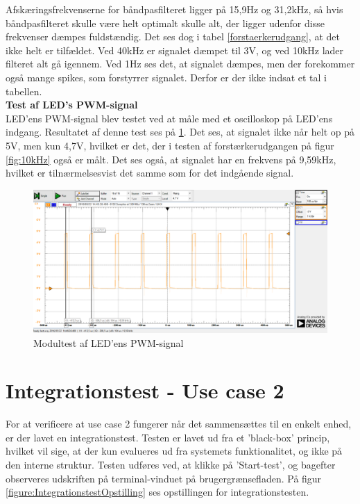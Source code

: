Afskæringsfrekvenserne for båndpasfilteret ligger på 15,9Hz og 31,2kHz, så hvis båndpasfilteret skulle være helt optimalt skulle alt, der ligger udenfor disse frekvenser dæmpes fuldstændig. Det ses dog i tabel \ref{forstaerkerudgang}, at det ikke helt er tilfældet. Ved 40kHz er signalet dæmpet til 3V, og ved 10kHz lader filteret alt gå igennem. Ved 1Hz ses det, at signalet dæmpes, men der forekommer også mange spikes, som forstyrrer signalet. Derfor er der ikke indsat et tal i tabellen. \\

\noindent \textbf{Test af LED's PWM-signal} \\
\noindent LED'ens PWM-signal blev testet ved at måle med et oscilloskop på LED'ens indgang. Resultatet af denne test ses på \ref{fig:LED_indgang}. Det ses, at signalet ikke når helt op på 5V, men kun 4,7V, hvilket er det, der i testen af forstærkerudgangen på figur \ref{fig:10kHz} også er målt. Det ses også, at signalet har en frekvens på 9,59kHz, hvilket er tilnærmelsesvist det samme som for det indgående signal. 

\begin{figure}[H]
	\centering
	\includegraphics[width=\textwidth]{Test/images/AffyringTest/LED_indgang}
	\caption{Modultest af LED'ens PWM-signal}
	\label{fig:LED_indgang}
\end{figure}

\section{Integrationstest - Use case 2}
For at verificere at use case 2 fungerer når det sammensættes til en enkelt enhed, er der lavet en integrationstest. Testen er lavet ud fra et 'black-box' princip, hvilket vil sige, at der kun evalueres ud fra systemets funktionalitet, og ikke på den interne struktur.
Testen udføres ved, at klikke på 'Start-test', og bagefter observeres udskriften på terminal-vinduet på brugergrænsefladen. På figur \ref{figure:IntegrationstestOpstilling} ses opstillingen for integrationstesten.

